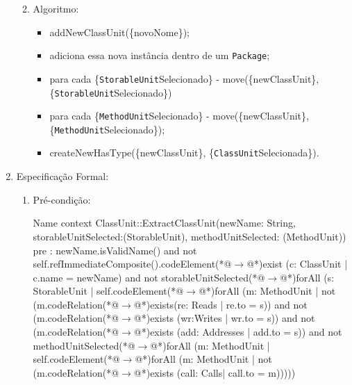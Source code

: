 \begin{enumerate}
\begin{enumerate}
\begin{minipage}{.90\textwidth}
	\fautor
	\label{fig:antes_e_depois_extract_ClassUnit}
\end{minipage}\hfill
			\item Algoritmo: 
			    \begin{itemize}
			        \item addNewClassUnit(\{novoNome\});
			        \item adiciona essa nova instância dentro de um \texttt{Package};
			        \item para cada \{\texttt{StorableUnit}Selecionado\} - move(\{newClassUnit\}, \{\texttt{StorableUnit}Selecionado\})
			        \item para cada \{\texttt{MethodUnit}Selecionado\} - move(\{newClassUnit\}, \{\texttt{MethodUnit}Selecionado\});
			        \item createNewHasType(\{newClassUnit\}, \{\texttt{ClassUnit}Selecionada\}).
			    \end{itemize} 
	    \end{enumerate}
		\item Especificação Formal:
		\begin{enumerate}
			\item Pré-condição: 
			\begin{codigo}[caption={[OCL representando a pré-condição da refatoração \textit{Extract ClassUnit}.] Pré-condição da refatoração \textit{Extract ClassUnit}.},escapeinside={(*@}{@*)}, basicstyle=\footnotesize, label={codigo:pre_extract_ClassUnit}, language=OCL]{Name}
context ClassUnit::ExtractClassUnit(newName: String, storableUnitSelected:(StorableUnit), methodUnitSelected: (MethodUnit))
pre : newName.isValidName() and not self.refImmediateComposite().codeElement(*@$\rightarrow$@*)exist (c: ClassUnit | c.name = newName) 
and not storableUnitSelected(*@$\rightarrow$@*)forAll (s: StorableUnit | self.codeElement(*@$\rightarrow$@*)forAll (m: MethodUnit | not (m.codeRelation(*@$\rightarrow$@*)exists(re: Reads | re.to = s)) and not (m.codeRelation(*@$\rightarrow$@*)exists (wr:Writes | wr.to = s)) and not (m.codeRelation(*@$\rightarrow$@*)exists (add: Addresses | add.to = s)) 
and not methodUnitSelected(*@$\rightarrow$@*)forAll (m: MethodUnit | self.codeElement(*@$\rightarrow$@*)forAll (m: MethodUnit | not (m.codeRelation(*@$\rightarrow$@*)exists (call: Calls| call.to = m)))))
\end{codigo}

\end{enumerate}
\end{enumerate}
